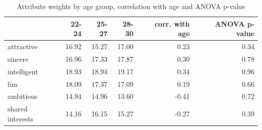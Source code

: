 \begin{table}[htbp]
\centering
\caption{Attribute weights by age group, correlation with age and ANOVA p-value}
\label{tab:q5_age}
\begin{tabular}{lrrrrr}
\toprule
 & 22-24 & 25-27 & 28-30 & corr. with age & ANOVA p-value \\
\midrule
attractive & 16.92 & 15.27 & 17.00 & 0.23 & 0.34 \\
sincere & 16.96 & 17.33 & 17.87 & 0.30 & 0.78 \\
intelligent & 18.93 & 18.94 & 19.17 & 0.34 & 0.96 \\
fun & 18.09 & 17.37 & 17.09 & 0.19 & 0.66 \\
ambitious & 14.94 & 14.96 & 13.60 & -0.41 & 0.72 \\
shared interests & 14.16 & 16.15 & 15.27 & -0.27 & 0.39 \\
\bottomrule
\end{tabular}
\end{table}
